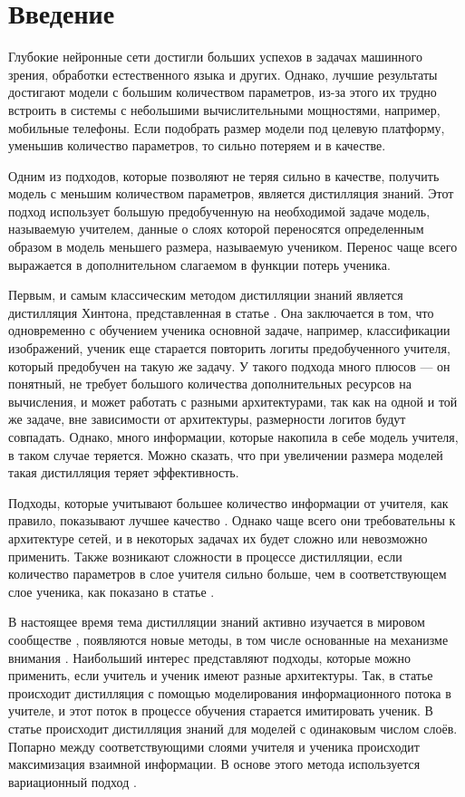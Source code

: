 \section{Введение}

Глубокие нейронные сети достигли больших успехов в задачах машинного зрения, обработки естественного языка и других.
Однако, лучшие результаты достигают модели с большим количеством параметров,
из-за этого их трудно встроить в системы с небольшими вычислительными мощностями, например, мобильные телефоны.
Если подобрать размер модели под целевую платформу, уменьшив количество параметров, то сильно потеряем и в качестве.

Одним из подходов, которые позволяют не теряя сильно в качестве, получить модель с меньшим количеством параметров, является дистилляция знаний.
Этот подход использует большую предобученную на необходимой задаче модель, называемую учителем,
данные о слоях которой переносятся определенным образом в модель меньшего размера, называемую учеником.
Перенос чаще всего выражается в дополнительном слагаемом в функции потерь ученика.

Первым, и самым классическим методом дистилляции знаний является дистилляция Хинтона, представленная в статье \cite{hinton2015distilling}.
Она заключается в том, что одновременно с обучением ученика основной задаче, например, классификации изображений,
ученик еще старается повторить логиты предобученного учителя, который предобучен на такую же задачу.
У такого подхода много плюсов --- он понятный, не требует большого количества дополнительных ресурсов на вычисления,
и может работать с разными архитектурами, так как на одной и той же задаче, вне зависимости от архитектуры, размерности логитов будут совпадать.
Однако, много информации, которые накопила в себе модель учителя, в таком случае теряется. Можно сказать, что при увеличении размера моделей такая
дистилляция теряет эффективность.

Подходы, которые учитывают большее количество информации от учителя, как правило, показывают лучшее качество \cite{Gou_2021}.
Однако чаще всего они требовательны к архитектуре сетей, и в некоторых задачах их будет сложно или невозможно применить.
Также возникают сложности в процессе дистилляции, если количество параметров в слое учителя сильно больше, чем в соответствующем слое ученика,
как показано в статье \cite{mirzadeh2020improved}.

В настоящее время тема дистилляции знаний активно изучается в мировом сообществе \cite{Gou_2021},
появляются новые методы, в том числе основанные на механизме внимания \cite{passban2020alpkd}.
Наибольший интерес представляют подходы, которые можно применить, если учитель и ученик имеют разные архитектуры.
Так, в статье \cite{passalis2020heterogeneous} происходит дистилляция с помощью моделирования информационного потока в учителе,
и этот поток в процессе обучения старается имитировать ученик.
В статье \cite{Ahn_2019_CVPR} происходит дистилляция знаний для моделей с одинаковым числом слоёв.
Попарно между соответствующими слоями учителя и ученика происходит максимизация взаимной информации.
В основе этого метода используется вариационный подход \cite{barber2004algorithm}.

